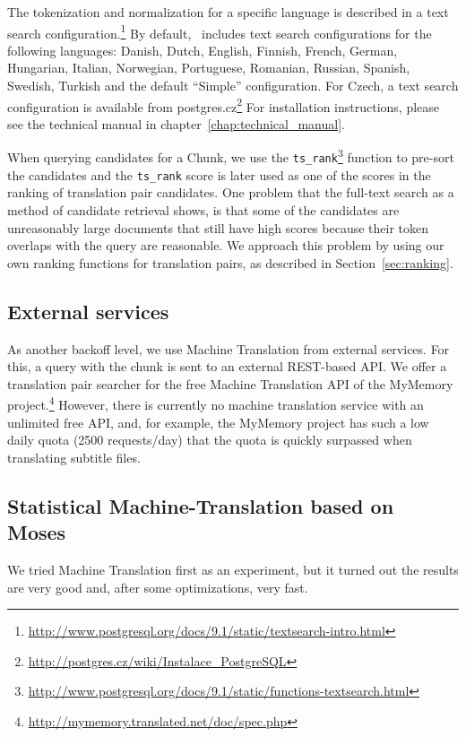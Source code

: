 The tokenization and normalization for a specific language is described in a text search configuration.\footnote{\url{http://www.postgresql.org/docs/9.1/static/textsearch-intro.html}} By default, \postgres~includes text search configurations for the following languages: Danish, Dutch, English, Finnish, French, German, Hungarian, Italian, Norwegian, Portuguese, Romanian, Russian, Spanish, Swedish, Turkish and the default ``Simple'' configuration. For Czech, a text search configuration is available from postgres.cz\footnote{\url{http://postgres.cz/wiki/Instalace_PostgreSQL}} For installation instructions, please see the technical manual in chapter~\ref{chap:technical_manual}.

When querying candidates for a Chunk, we use the {\tt ts\_rank}\footnote{\url{http://www.postgresql.org/docs/9.1/static/functions-textsearch.html}} function to pre-sort the candidates and the {\tt ts\_rank} score is later used as one of the scores in the ranking of translation pair candidates. One problem that the full-text search as a method of candidate retrieval shows, is that some of the candidates are unreasonably large documents that still have high scores because their token overlaps with the query are reasonable. We approach this problem by using our own ranking functions for translation pairs, as described in Section~\ref{sec:ranking}.


\subsection{External services}

As another backoff level, we use Machine Translation from external services.
For this, a query with the chunk is sent to an external REST-based API. We offer a translation pair searcher for the free Machine Translation API of the MyMemory project.\footnote{ \url{http://mymemory.translated.net/doc/spec.php}} However, there is currently no machine translation service with an unlimited free API, and, for example, the MyMemory project has such a low daily quota (2500 requests/day) that the quota is quickly surpassed when translating subtitle files.

\subsection{Statistical Machine-Translation based on Moses}
\label{sec:statmtmoses}

We tried Machine Translation first as an experiment, but it turned out the results are very good and, after some optimizations, very fast.

